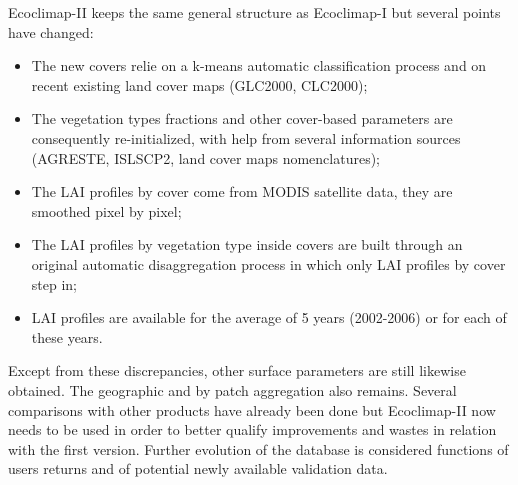 Ecoclimap-II keeps the same general structure as Ecoclimap-I but several points have changed:
\begin{itemize}
\item{The new covers relie on a k-means automatic classification process and on recent existing land 
cover maps (GLC2000, CLC2000);}
\item{The vegetation types fractions and other cover-based parameters are consequently re-initialized, with 
help from several information sources (AGRESTE, ISLSCP2, land cover maps nomenclatures);}
\item{The LAI profiles by cover come from MODIS satellite data, they are smoothed pixel by pixel;}
\item{The LAI profiles by vegetation type inside covers are built through an original automatic disaggregation 
process in which only LAI profiles by cover step in; }
\item{LAI profiles are available for the average of 5 years (2002-2006) or for each of these years. }
\end{itemize}
Except from these discrepancies, other surface parameters are still likewise obtained. The geographic and 
by patch aggregation also remains. 
Several comparisons with other products have already been done but Ecoclimap-II now needs to be used in 
order to better qualify improvements and wastes in relation with the first version. Further evolution of the database 
is considered functions of users returns and of potential newly available validation data. 


